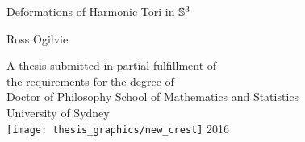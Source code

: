 \cleardoublepage\thispagestyle{empty}%
\centering
Deformations of Harmonic Tori in $\S^3$
\par\vspace{30pt}%
\centering\mdseries Ross Ogilvie \par\bigskip
\endgroup
\vfil\vfil\vfil
\begin{center}
    A thesis submitted in partial fulfillment of\\
    the requirements for the degree of\\
    Doctor of Philosophy
\vfil\vfil
  {\large{School of Mathematics and Statistics}\\[5pt]
  University of Sydney}\\
  \vskip6mm
  \texttt{[image: thesis\_graphics/new\_crest]}
\vfil
  \normalsize 2016
\end{center}
\vfil
\endgroup
\cleardoublepage
